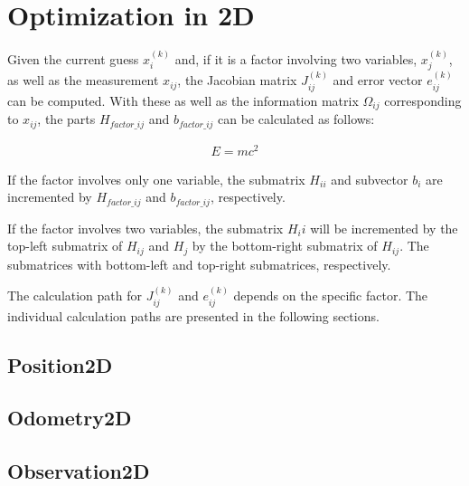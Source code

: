 \section{Optimization in 2D}


Given the current guess $x_i^{(k)}$ and, if it is a factor involving two variables, $x_j^{(k)}$, as well as the measurement $x_{ij}$, the Jacobian matrix $J_{ij}^{(k)}$ and error vector $e_{ij}^{(k)}$ can be computed. With these as well as the information matrix $\Omega_{ij}$ corresponding to $x_{ij}$, the parts $H_{factor\_ij}$ and $b_{factor\_ij}$ can be calculated as follows:


\begin{align}
	E = mc^2
\end{align}

If the factor involves only one variable, the submatrix $H_{ii}$ and subvector $b_i$ are incremented by $H_{factor\_ij}$ and $b_{factor\_ij}$, respectively.

If the factor involves two variables, the submatrix $H_ii$ will be incremented by the top-left submatrix of $H_{ij}$ and $H_j$ by the bottom-right submatrix of $H_{ij}$. The submatrices with bottom-left and top-right submatrices, respectively.

The calculation path for $J_{ij}^{(k)}$ and $e_{ij}^{(k)}$ depends on the specific factor. The individual calculation paths are presented in the following sections.

\subsection{Position2D}

\subsection{Odometry2D}

\subsection{Observation2D}
